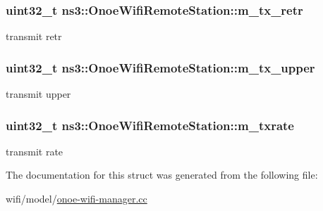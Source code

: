 \subsubsection[{\texorpdfstring{m\+\_\+tx\+\_\+retr}{m_tx_retr}}]{\setlength{\rightskip}{0pt plus 5cm}uint32\+\_\+t ns3\+::\+Onoe\+Wifi\+Remote\+Station\+::m\+\_\+tx\+\_\+retr}\hypertarget{structns3_1_1OnoeWifiRemoteStation_a07bc616af518568afe21c07e4704b90c}{}\label{structns3_1_1OnoeWifiRemoteStation_a07bc616af518568afe21c07e4704b90c}


transmit retr 

\subsubsection[{\texorpdfstring{m\+\_\+tx\+\_\+upper}{m_tx_upper}}]{\setlength{\rightskip}{0pt plus 5cm}uint32\+\_\+t ns3\+::\+Onoe\+Wifi\+Remote\+Station\+::m\+\_\+tx\+\_\+upper}\hypertarget{structns3_1_1OnoeWifiRemoteStation_ab8a2a4780aac705a2b7a61689800666b}{}\label{structns3_1_1OnoeWifiRemoteStation_ab8a2a4780aac705a2b7a61689800666b}


transmit upper 

\subsubsection[{\texorpdfstring{m\+\_\+txrate}{m_txrate}}]{\setlength{\rightskip}{0pt plus 5cm}uint32\+\_\+t ns3\+::\+Onoe\+Wifi\+Remote\+Station\+::m\+\_\+txrate}\hypertarget{structns3_1_1OnoeWifiRemoteStation_a80cc4cb0e267548b0e21fc9bc5c25321}{}\label{structns3_1_1OnoeWifiRemoteStation_a80cc4cb0e267548b0e21fc9bc5c25321}


transmit rate 



The documentation for this struct was generated from the following file\+:\begin{DoxyCompactItemize}
\item 
wifi/model/\hyperlink{onoe-wifi-manager_8cc}{onoe-\/wifi-\/manager.\+cc}\end{DoxyCompactItemize}

